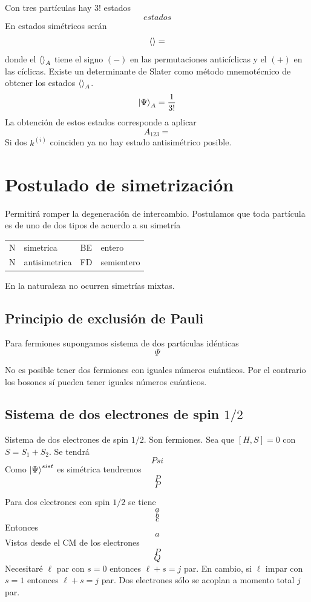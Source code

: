 \documentclass[10pt,oneside]{CBFT_book}
\begin{document}
Con tres partículas hay $3!$ estados
\[
	estados 
\]
En estados simétricos serán 
\[
	\Braket{} =
\]
donde el $\Braket{}_A$ tiene el signo $(-)$ en las permutaciones anticíclicas y el $(+)$ en las cíclicas.
Existe un determinante de Slater como método mnemotécnico de obtener los estados $\Braket{}_A$.
\[
	\Ket{ \Psi }_A = \frac{1}{3!}
\]
La obtención de estos estados corresponde a aplicar 
\[
	A_{123} =
\]
Si dos $k^{(i)}$ coinciden ya no hay estado antisimétrico posible.

\section{Postulado de simetrización}

Permitirá romper la degeneración de intercambio. 
Postulamos que toda partícula es de uno de dos tipos de acuerdo a su simetría 

\begin{center}
\begin{tabular}{llll}
N & simetrica & BE & entero\\
N & antisimetrica & FD & semientero
\end{tabular}
\end{center}

En la naturaleza no ocurren simetrías mixtas.

\subsection{Principio de exclusión de Pauli}

Para fermiones supongamos sistema de dos partículas idénticas 
\[
	\Psi
\]

No es posible tener dos fermiones con iguales números cuánticos. Por el contrario los bosones sí pueden tener 
iguales números cuánticos.

\subsection{Sistema de dos electrones de spin $1/2$}

Sistema de dos electrones de spin $1/2$. Son fermiones. Sea que $[H,S]=0$  con $S = S_1 + S_2$. Se tendrá 
\[
	Psi
\]
Como $\Ket{\Psi}^{sist}$ es simétrica tendremos 
\[
	P
\]
\[
	P
\]

Para dos electrones con spin $1/2$ se tiene 
\[
	a
\]
\[
	b
\]
\[
	c
\]
Entonces 
\[
	a
\]
Vistos desde el CM de los electrones
\[
	P
\]
\[
	Q
\]
Necesitaré $\ell$ par con $s=0$ entonces $\ell+s=j$ par. En cambio, si $\ell$ impar con $s=1$ entonces 
$\ell+s=j$ par. Dos electrones sólo se acoplan a momento total $j$ par.
\end{document}
